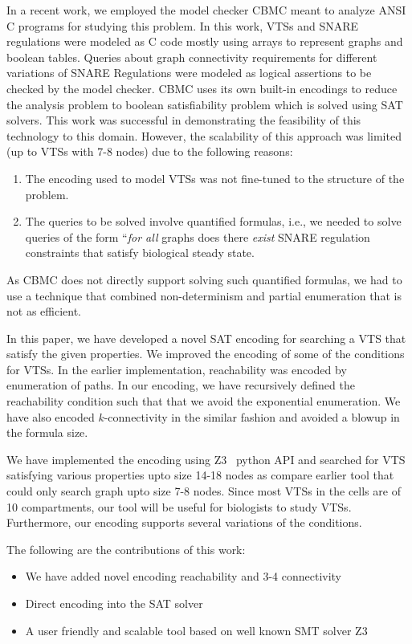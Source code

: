In a recent work, we employed the model checker CBMC \cite{CKY03,
ckl2004} meant to analyze ANSI C programs for studying this problem.
%
In this work, VTSs and SNARE regulations were modeled as C code mostly
using arrays to represent graphs and boolean tables.
%
Queries about graph connectivity requirements for different variations
of SNARE Regulations were modeled as logical assertions to be checked
by the model checker.
%
CBMC uses its own built-in encodings to reduce the analysis problem to
boolean satisfiability problem which is solved using SAT solvers.
%
This work was successful in demonstrating the feasibility of this
technology to this domain.
%
However, the scalability of this approach was limited (up to VTSs
with 7-8 nodes) due to the following reasons:
\begin{enumerate}
\item The encoding used to model VTSs was not fine-tuned
to the structure of the problem.
\item The queries to be solved involve quantified formulas, i.e., we
needed to solve queries of the form ``\emph{for all} graphs does there
\emph{exist} SNARE regulation constraints that satisfy biological
steady state.
\end{enumerate} As CBMC does not directly support solving such
quantified formulas, we had to use a technique that combined
non-determinism and partial enumeration that is not as
efficient.\newline

%
In this paper, we have developed a novel SAT encoding for
searching a VTS that satisfy the given properties.
%
We improved the encoding of some of the conditions for VTSs.
%
In the earlier implementation, reachability was encoded by
enumeration of paths.
%
In our encoding, we have recursively defined the reachability condition
such that that we avoid the exponential enumeration.
%
We have also encoded $k$-connectivity in the similar fashion and
avoided a blowup in the formula size.
%

We have implemented the encoding using Z3~\cite{z3} python API and searched for
VTS satisfying various properties upto size 14-18 nodes as compare
earlier tool that could only search graph upto size 7-8 nodes.
%
Since most VTSs in the cells are of 10 compartments,
our tool will be useful for biologists to study VTSs.
%
Furthermore, our encoding supports several variations of
the conditions.\newline

The following are the contributions of this work:
\begin{itemize}
\item We have added novel encoding reachability and 3-4 connectivity
\item Direct encoding into the SAT solver
\item A user friendly and scalable tool based on well known SMT solver Z3
\end{itemize}


